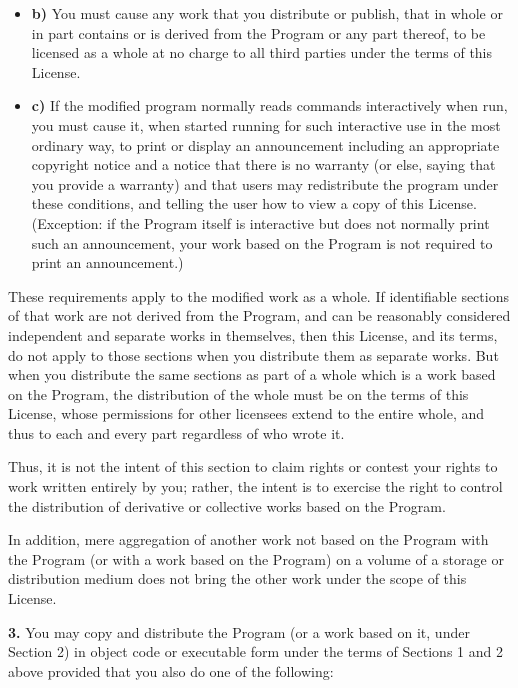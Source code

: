 {\begin{itemize}
\item {\bf b)} You must cause any work that you distribute or  publish, that
   in whole or in part contains or is derived from the Program or  any part
   thereof, to be licensed as a whole at no charge to all third parties  under
the terms of this License.  

\item {\bf c)} If the modified program normally reads commands  interactively
   when run, you must cause it, when started running for such  interactive use in
   the most ordinary way, to print or display an announcement  including an
appropriate copyright notice and a notice that there is no  warranty (or else,
saying that you provide a warranty) and that users may  redistribute the
program under these conditions, and telling the user how to  view a copy of
this License. (Exception: if the Program itself is interactive  but does not
normally print such an announcement, your work based on the  Program is not
required to print an announcement.) 
\end{itemize}

These requirements apply to the modified work as a whole. If identifiable
sections of that work are not derived from the Program, and can be reasonably
considered independent and separate works in themselves, then this License,
and its terms, do not apply to those sections when you distribute them as
separate works. But when you distribute the same sections as part of a whole
which is a work based on the Program, the distribution of the whole must be on
the terms of this License, whose permissions for other licensees extend to the
entire whole, and thus to each and every part regardless of who wrote it. 

Thus, it is not the intent of this section to claim rights or contest your
rights to work written entirely by you; rather, the intent is to exercise the
right to control the distribution of derivative or collective works based on
the Program. 

In addition, mere aggregation of another work not based on the Program with
the Program (or with a work based on the Program) on a volume of a storage or
distribution medium does not bring the other work under the scope of this
License. 

{\bf 3.} You may copy and distribute the Program (or a work based on it, under
Section 2) in object code or executable form under the terms of Sections 1 and
2 above provided that you also do one of the following: 

}
